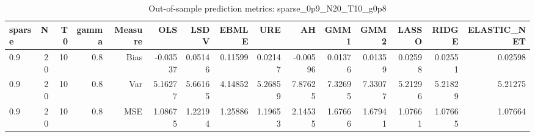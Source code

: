 \begin{table}[!htbp]\centering
\caption{Out-of-sample prediction metrics: sparse_0p9_N20_T10_g0p8}
\label{tab:table3_sparse_0p9_N20_T10_g0p8}
\begin{tabular}{lrrrrrrrrrrrrrr}
\hline
sparse & N & T0 & gamma & Measure & OLS & LSDV & EBMLE & URE & AH & GMM1 & GMM2 & LASSO & RIDGE & ELASTIC_NET \\
\hline
0.9 & 20 & 10 & 0.8 & Bias & -0.03537 & 0.05146 & 0.11599 & 0.02147 & -0.00596 & 0.01376 & 0.01359 & 0.02598 & 0.02551 & 0.02598 \\
0.9 & 20 & 10 & 0.8 & Var & 5.16277 & 5.66165 & 4.14852 & 5.26859 & 7.87625 & 7.32695 & 7.33077 & 5.21296 & 5.21829 & 5.21275 \\
0.9 & 20 & 10 & 0.8 & MSE & 1.08675 & 1.22194 & 1.25886 & 1.19653 & 2.14535 & 1.67666 & 1.67941 & 1.07661 & 1.07665 & 1.07664 \\
\hline
\end{tabular}
\end{table}

